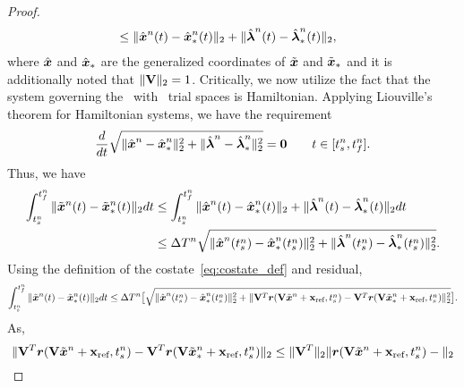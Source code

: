 \begin{proof}
\begin{align*}
&\le  \| \hat{ \boldsymbol x}^{n}(t) - \hat{ \boldsymbol x}_{*}^{n}(t) \|_2 + \|  \hat{\boldsymbol \lambda}^{n}(t) - 
 \hat{\boldsymbol \lambda}_*^{n}(t)  \|_2, 
\end{align*}
where $\hat{ \boldsymbol x}$ and $\hat{ \boldsymbol x}_{*}$ are the generalized coordinates of $\tilde{\boldsymbol x}$ and $\tilde{\boldsymbol x}_{*}$ and it is additionally noted that $\| \mathbf {V} \|_2 = 1$.
Critically, we now utilize the fact that the system governing the \methodAcronymROM\ with \spatialAcronym\ trial spaces is Hamiltonian. 
Applying Liouville's theorem for Hamiltonian systems, we have the requirement 
$$ \frac{d}{dt}  \sqrt{ \| \hat{ \boldsymbol x}^{n} - \hat{ \boldsymbol x}_{*}^{n} \|_2^2 + \| \hat{\boldsymbol \lambda}^{n} - 
\hat{\boldsymbol \lambda}_*^{n}  \|_2^2}  = \boldsymbol 0 \qquad t \in [t_s^{n},t_f^{n}].$$
Thus, we have
\begin{align*}
\int_{t_s^{n}}^{t_f^{n}} \| \tilde{\boldsymbol x}^{n}(t) - \tilde{\boldsymbol x}_{*}^{n}(t) \|_2 dt &\le 
\int_{t_s^{n}}^{t_f^{n}} \| \hat{ \boldsymbol x}^{n}(t) - \hat{ \boldsymbol x}_{*}^{n}(t) \|_2 + \|  \hat{\boldsymbol \lambda}^{n}(t) - 
 \hat{\boldsymbol \lambda}_*^{n}(t)  \|_2 dt \\
&\le  \Delta T^{n}  \sqrt{ \| \hat{ \boldsymbol x}^{n}(t_s^{n}) - \hat{ \boldsymbol x}_{*}^{n}(t_s^{n} ) \|_2^2 + \| \hat{\boldsymbol \lambda}^{n}(t_s^{n}) - 
\hat{\boldsymbol \lambda}_*^{n}(t_s^{n})   \|_2^2}.
\end{align*}
Using the definition of the costate~\eqref{eq:costate_def} and residual, 
\begin{equation*}
\int_{t_s^{n}}^{t_f^{n}} \| \tilde{\boldsymbol x}^{n}(t) - \tilde{\boldsymbol x}_{*}^{n}(t) \|_2 dt 
\le  \Delta T^{n} \big[ \sqrt{ \| \hat{ \boldsymbol x}^{n}(t_s^{n}) - \hat{ \boldsymbol x}_{*}^{n}(t_s^{n} ) \|_2^2 +   \| \mathbf {V}^T \boldsymbol r( \mathbf {V} \tilde{\boldsymbol x}^{n} + \mathbf{x}_\text{ref} , {t_s^{n}} ) - 
 \mathbf {V}^T \boldsymbol r( \mathbf {V} \tilde{\boldsymbol x}_{*}^{n} + \mathbf{x}_\text{ref}, {t_s^{n}}  ) \|_2^2  } \big].
\end{equation*}
As, 
\begin{equation*}
\| \mathbf {V}^T \boldsymbol r( \mathbf {V} \tilde{\boldsymbol x}^{n} + \mathbf{x}_\text{ref} , {t_s^{n}}) - 
 \mathbf {V}^T \boldsymbol r( \mathbf {V} \tilde{\boldsymbol x}_{*}^{n} + \mathbf{x}_\text{ref}, {t_s^{n}}  ) \|_2
\le
 \| \mathbf {V}^T \|_2 \|  \boldsymbol r( \mathbf {V} \tilde{\boldsymbol x}^{n} + \mathbf{x}_\text{ref} , {t_s^{n}}) - 
 \|_2
\end{equation*}
\end{proof}
